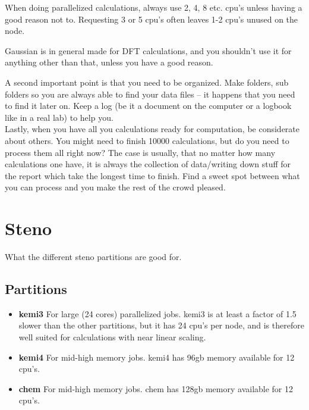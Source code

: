 \documentclass{article}
\begin{document}
When doing parallelized calculations, always use 2, 4, 8 etc. cpu's unless having a good reason not to.
Requesting 3 or 5 cpu's often leaves 1-2 cpu's unused on the node.

Gaussian is in general made for DFT calculations, and you shouldn't use it for anything other than that, unless you have a good reason.

A second important point is that you need to be organized.
Make folders, sub folders so you are always able to find your data files – it happens that you need to find it later on.
Keep a log (be it a document on the computer or a logbook like in a real lab) to help you.\\

Lastly, when you have all you calculations ready for computation, be considerate about others.
You might need to finish 10000 calculations, but do you need to process them all right now?
The case is usually, that no matter how many calculations one have, it is always the collection of data/writing down stuff for the report which take the longest time to finish.
Find a sweet spot between what you can process and you make the rest of the crowd pleased.\\


\newpage
\section{Steno}

What the different steno partitions are good for.

\subsection*{Partitions}

\begin{itemize}

    \item {\bf kemi3} 
        For large (24 cores) parallelized jobs.
        kemi3 is at least a factor of 1.5 slower than the other partitions, but it has 24 cpu's per node, and is therefore well suited for calculations with near linear scaling.


    \item {\bf kemi4} 
        For mid-high memory jobs.
        kemi4 has 96gb memory available for 12 cpu's.

    \item {\bf chem} 
        For mid-high memory jobs.
        chem has 128gb memory available for 12 cpu's.

\end{itemize}



\end{document}
